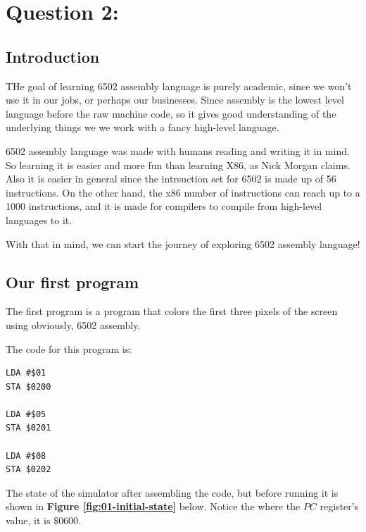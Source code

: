 \documentclass[a4paper]{article}
\begin{document}
\newpage

\section{Question 2:}

\subsection{Introduction}

THe goal of learning 6502 assembly language is purely academic, since we won't use it in our jobs, or perhaps our businesses. Since assembly is the lowest level language before the raw machine code, so it gives good understanding of the underlying things we we work with a fancy high-level language.

6502 assembly language was made with humans reading and writing it in mind. So learning it is easier and more fun than learning X86, as Nick Morgan claims. Also it is easier in general since the intrsuction set for 6502 is made up of 56 instructions. On the other hand, the x86 number of instructions can reach up to a 1000 instructions, and it is made for compilers to compile from high-level languages to it.

With that in mind, we can start the journey of exploring 6502 assembly language!

\subsection{Our first program}

The first program is a program that colors the first three pixels of the screen using obviously, 6502 assembly.

The code for this program is:

\begin{lstlisting}[style=6502asm]
LDA #$01
STA $0200

LDA #$05
STA $0201

LDA #$08
STA $0202
\end{lstlisting}

The state of the simulator after assembling the code, but before running it is shown in \textbf{Figure \ref{fig:01-initial-state}} below. Notice the where the $PC$ register's value, it is $\$0600$.
\end{document}
